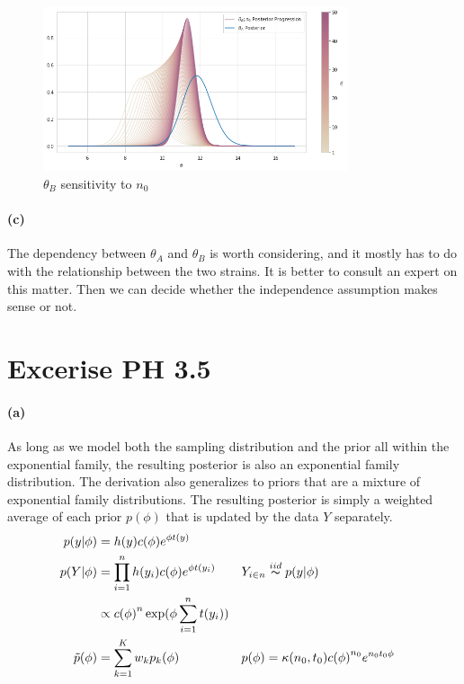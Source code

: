 \documentclass[11pt, letterpaper]{article}
\begin{document}
\begin{figure}[!h]
  \centering
  \includegraphics[width=0.8\textwidth]{3.3.b.png}
  \captionsetup{justification=centering}
  \caption{$\theta_B$ sensitivity to $n_0$}
\end{figure}

\paragraph{(c)}
The dependency between $\theta_A$ and $\theta_B$ is worth considering, and it mostly has to do with the
relationship between the two strains. It is better to consult an expert on this matter. Then we can decide
whether the independence assumption makes sense or not. 
\newpage

\section{Excerise PH 3.5}
\paragraph{(a)}
As long as we model both the sampling distribution and the prior all within the exponential family, the resulting
posterior is also an exponential family distribution. The derivation also generalizes to priors that are
a mixture of exponential family distributions. The resulting posterior is simply a weighted average
of each prior $p(\phi)$ that is updated by the data $Y$ separately.
\begin{align*}
  p(y|\phi) &= h(y)c(\phi)e^{\phi t(y)} \\
  p(Y|\phi) &= \prod_{i=1}^{n} h(y_i)c(\phi)e^{\phi t(y_i)} && Y_{i \in n} \overset{iid}{\thicksim} p(y|\phi) \\
    &\propto {c(\phi)}^{n} \exp(\phi \sum_{i=1}^{n} t(y_i)) \\
  \tilde{p}(\phi) &= \sum_{k=1}^{K} w_k p_k(\phi) && p(\phi) = \kappa(n_0, t_0) {c(\phi)}^{n_0} e^{n_0 t_0 \phi}
\end{align*}
\end{document}

